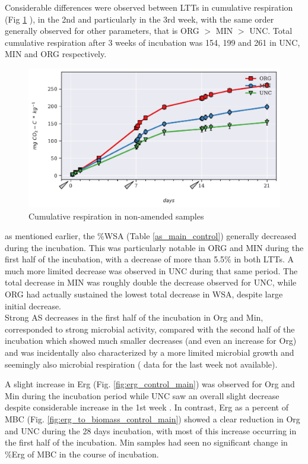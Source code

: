 \documentclass[12pt]{report}
\begin{document}
		Considerable differences were observed between LTTs in cumulative respiration (Fig \ref{fig:cumulative_control_main} ), in the 2nd and particularly in the 3rd week, with the same order generally observed for other parameters, that is ORG $ > $ MIN $ > $ UNC. Total cumulative respiration after 3 weeks of incubation was 154, 199 and 261 in UNC, MIN and ORG respectively.
			\begin{figure}[H]
			\centering
			\includegraphics[scale=0.8]{thesis_figures/main_incubation/control/Cum_Resp.pdf}
			\caption{Cumulative respiration in non-amended samples}
			\label{fig:cumulative_control_main}
			\end{figure}
		as mentioned earlier, the $ \% $WSA (Table \ref{as_main_control}) generally decreased   during the incubation. This was particularly notable in ORG and MIN during the first half of the incubation, with a decrease of more than 5.5\% in both LTTs. A much more limited decrease was observed in UNC during that same period. The total decrease in MIN was roughly double the decrease observed for UNC, while ORG had actually sustained the lowest total decrease in WSA, despite large initial decrease. \\
		Strong AS decreases in the first half of the incubation in Org and Min, corresponded to strong microbial activity, compared with the second half of the incubation which showed much smaller decreases (and even an increase for Org) and was incidentally also characterized by a more limited microbial growth and seemingly also microbial respiration ( data for the last week not available).
		
		
		
		A slight increase in Erg (Fig. \ref{fig:erg_control_main}) was observed for Org and Min during the incubation period while UNC saw an overall slight decrease despite considerable increase in the 1st week . In contrast, Erg as a percent of MBC (Fig. \ref{fig:erg_to_biomass_control_main}) showed a clear reduction in Org and UNC during the 28 days incubation, with most of this increase occurring in the first half of the incubation. Min samples had seen no significant change in \%Erg of MBC in the course of incubation.  			
		
\end{document}
